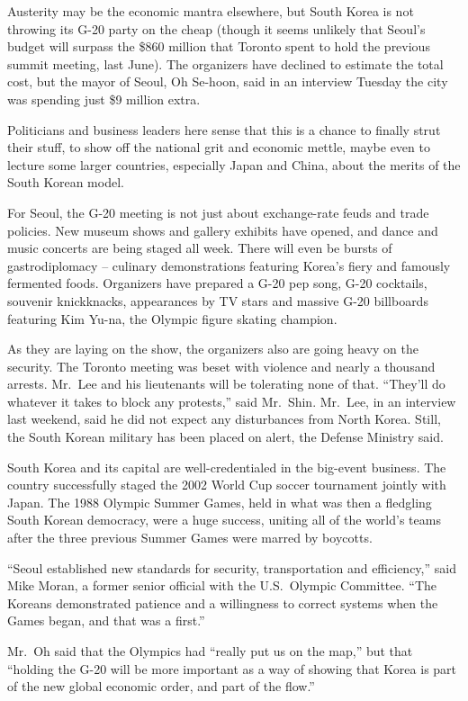 ﻿\documentclass[12pt]{article}
\begin{document}
Austerity may be the economic mantra elsewhere, but South Korea is not throwing its G-20 party on
the cheap (though it seems unlikely that Seoul's budget will surpass the \$860 million that Toronto
spent to hold the previous summit meeting, last June). The organizers have declined to estimate the
total cost, but the mayor of Seoul, Oh Se-hoon, said in an interview Tuesday the city was spending
just \$9 million extra.

Politicians and business leaders here sense that this is a chance to finally strut their stuff, to
show off the national grit and economic mettle, maybe even to lecture some larger countries,
especially Japan and China, about the merits of the South Korean model.

For Seoul, the G-20 meeting is not just about exchange-rate feuds and trade policies. New museum
shows and gallery exhibits have opened, and dance and music concerts are being staged all week.
There will even be bursts of gastrodiplomacy -- culinary demonstrations featuring Korea's fiery and
famously fermented foods. Organizers have prepared a G-20 pep song, G-20 cocktails, souvenir
knickknacks, appearances by TV stars and massive G-20 billboards featuring Kim Yu-na, the Olympic
figure skating champion.

As they are laying on the show, the organizers also are going heavy on the security. The Toronto
meeting was beset with violence and nearly a thousand arrests. Mr.~Lee and his lieutenants will be
tolerating none of that. ``They'll do whatever it takes to block any protests,'' said Mr.~Shin.
Mr.~Lee, in an interview last weekend, said he did not expect any disturbances from North Korea.
Still, the South Korean military has been placed on alert, the Defense Ministry said.

South Korea and its capital are well-credentialed in the big-event business. The country
successfully staged the 2002 World Cup soccer tournament jointly with Japan. The 1988 Olympic Summer
Games, held in what was then a fledgling South Korean democracy, were a huge success, uniting all of
the world's teams after the three previous Summer Games were marred by boycotts.

``Seoul established new standards for security, transportation and efficiency,'' said Mike Moran, a
former senior official with the U.S.~Olympic Committee. ``The Koreans demonstrated patience and a
willingness to correct systems when the Games began, and that was a first.''

Mr.~Oh said that the Olympics had ``really put us on the map,'' but that ``holding the G-20 will be
more important as a way of showing that Korea is part of the new global economic order, and part of
the flow.''
\end{document}
